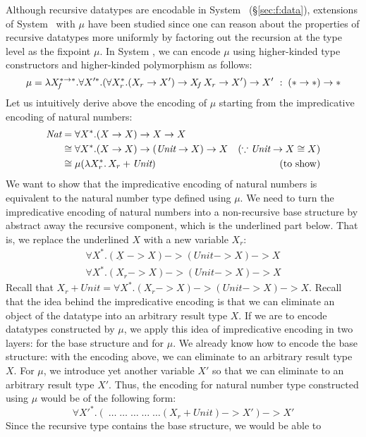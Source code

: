 Although recursive datatypes are encodable in System \F\ (\S\ref{sec:f:data}),
extensions of System \F\ with $\mu$ have been studied %
since one can reason about the properties of recursive datatypes more
uniformly by factoring out the recursion at the type level as
the fixpoint $\mu$. In System \Fw, we can encode $\mu$ using
higher-kinded type constructors and higher-kinded polymorphism as follows:
\[
\mu =
 \lambda X_{\!f}^{* -> *}.
 \forall X'^{*}.(\forall X_r^{*}.(X_r -> X') -> X_{\!f}\,X_r -> X') -> X'
 ~:\; (* -> *) -> *
\]
Let us intuitively derive above the encoding of $\mu$ starting from
the impredicative encoding of natural numbers:
\begin{align*}
\textit{Nat}
        &= \forall X^{*} . (X -> X) -> X -> X \\
        &\cong \forall X^{*} . (X -> X) -> (\textit{Unit} -> X) -> X 
                &(\because \textit{Unit} -> X \cong X) \\
        &\cong \mu(\lambda X_r^{*}.\,X_r + \textit{Unit})
                & (\text{to show})
\end{align*}
We want to show that the impredicative encoding of natural numbers is
equivalent to the natural number type defined using $\mu$. We need to turn
the impredicative encoding of natural numbers into a non-recursive
base structure by abstract away the recursive component, which is
the underlined part below. That is, we replace the underlined $X$
with a new variable $X_r$:
\begin{align*}
\forall X^{*} . (\underline{X}\; -> X) -> (\textit{Unit} -> X) -> X \\
\forall X^{*} . (X_r -> X) -> (\textit{Unit} -> X) -> X
\end{align*}
Recall that
$X_r +\textit{Unit} = \forall X^{*} . (X_r -> X) -> (\textit{Unit} -> X) -> X$.
Recall that the idea behind the impredicative encoding is that we can eliminate
an object of the datatype into an arbitrary result type $X$. If we are to
encode datatypes constructed by $\mu$, we apply this idea of
impredicative encoding in two layers: for the base structure and for $\mu$.
We already know how to encode the base structure: with the encoding above,
we can eliminate to an arbitrary result type $X$. For $\mu$, we introduce
yet another variable $X'$ so that we can eliminate to an arbitrary result
type $X'$. Thus, the encoding for natural number type constructed using $\mu$
would be of the following form:
\[ \forall X'^{*}.(\;\dots\;\dots\;\dots\;\dots\;\dots (X_r + \textit{Unit}) -> X') -> X' \]
Since the recursive type contains the base structure, we would be able to
